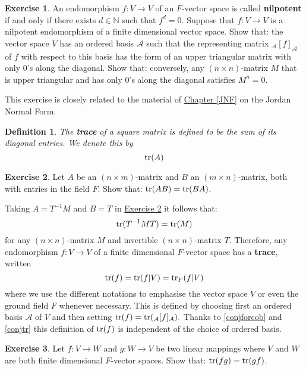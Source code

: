 \documentclass[11pt]{amsbook}
\newtheorem{definition}[theorem]{Definition}
\theoremstyle{definition}
\newtheorem{exercise}{Exercise}
\begin{document}
\begin{exercise}\label{nilpex}
An endomorphism $f:V\to V$ of an $F$-vector space is called {\bf nilpotent} if and only if there exists $d\in \mathbb{N}$ such that $f^d = 0$. Suppose that $f: V\to V$ is a nilpotent endomorphism of a finite dimensional vector space. Show that: the vector space $V$ has an ordered basis $\mathcal{A}$ such that the representing matrix ${}_{\mathcal{A}}[f]_{\mathcal{A}}$ of $f$ with respect to this basis has the form of an upper triangular matrix with only $0$'s along the diagonal. Show that: conversely, any $(n\times n)$-matrix $M$ that is upper triangular and has only $0$'s along the diagonal satisfies $M^{n} = 0$.
\end{exercise}
This exercise is closely related to the material of \hyperref[JNF]{Chapter \ref{JNF}} on the Jordan Normal Form.

\begin{definition}
The {\bf trace} of a square matrix is defined to be the sum of its diagonal entries. We denote this by $${\rm tr}(A)$$
\end{definition}

\begin{exercise}\label{traceisatrace}
Let $A$ be an $(n\times m)$-matrix and $B$ an $(m\times n)$-matrix, both with entries in the field $F$. Show that: ${\rm tr}(AB) = {\rm tr}(BA)$.
\end{exercise}

Taking $A = T^{-1}M$ and $B = T$ in \hyperref[traceisatrace]{Exercise \ref{traceisatrace}} it follows that:\begin{equation} \label{conjtr}{\rm tr}(T^{-1}MT) = {\rm tr}(M)\end{equation} for any $(n\times n)$-matrix $M$ and invertible $(n\times n)$-matrix $T$. Therefore, any endomorphism $f:V\to V$ of a finite dimensional $F$-vector space has a {\bf trace}, written \begin{equation*} {\rm tr}(f) = {\rm tr}(f|V) = {\rm tr}_F(f|V)\end{equation*} where we use the different notations to emphasise the vector space $V$ or even the ground field $F$ whenever necessary. This is defined by choosing first an ordered basis $\mathcal{A}$ of $V$ and then setting ${\rm tr}(f) = {\rm tr}({}_\mathcal{A}[f]_\mathcal{A}).$ Thanks to \hyperref[conjforcob]{\eqref{conjforcob}} and \hyperref[conjtr]{\eqref{conjtr}} this definition of ${\rm tr}(f)$ is independent of the choice of ordered basis.

\begin{exercise} Let $f:V \to W$ and $g:W\to V$ be two linear mappings where $V$ and $W$ are both finite dimensional $F$-vector spaces. Show that: ${\rm tr}(fg) = {\rm tr}(gf)$.
\end{exercise}
\end{document}
